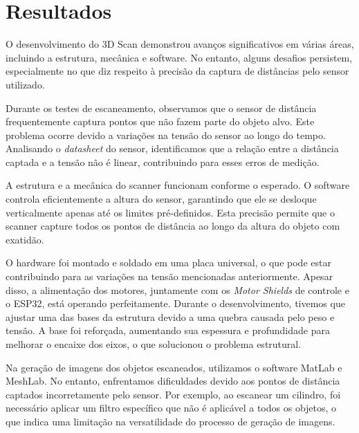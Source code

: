 
\chapter{Resultados}\label{cap:resultados}

O desenvolvimento do 3D Scan demonstrou avanços significativos em várias áreas, incluindo a estrutura, mecânica e software. No entanto, alguns desafios persistem, especialmente no que diz respeito à precisão da captura de distâncias pelo sensor utilizado.

Durante os testes de escaneamento, observamos que o sensor de distância frequentemente captura pontos que não fazem parte do objeto alvo. Este problema ocorre devido a variações na tensão do sensor ao longo do tempo. Analisando o \textit{datasheet} do sensor, identificamos que a relação entre a distância captada e a tensão não é linear, contribuindo para esses erros de medição.

A estrutura e a mecânica do scanner funcionam conforme o esperado. O software controla eficientemente a altura do sensor, garantindo que ele se desloque verticalmente apenas até os limites pré-definidos. Esta precisão permite que o scanner capture todos os pontos de distância ao longo da altura do objeto com exatidão.

O hardware foi montado e soldado em uma placa universal, o que pode estar contribuindo para as variações na tensão mencionadas anteriormente. Apesar disso, a alimentação dos motores, juntamente com os\textit{ Motor Shields} de controle e o ESP32, está operando perfeitamente. Durante o desenvolvimento, tivemos que ajustar uma das bases da estrutura devido a uma quebra causada pelo peso e tensão. A base foi reforçada, aumentando sua espessura e profundidade para melhorar o encaixe dos eixos, o que solucionou o problema estrutural.

Na geração de imagens dos objetos escaneados, utilizamos o software MatLab e MeshLab. No entanto, enfrentamos dificuldades devido aos pontos de distância captados incorretamente pelo sensor. Por exemplo, ao escanear um cilindro, foi necessário aplicar um filtro específico que não é aplicável a todos os objetos, o que indica uma limitação na versatilidade do processo de geração de imagens.

